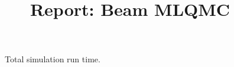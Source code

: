 \documentclass[11pt, oneside]{article}
\title{Report: Beam MLQMC}
\date{}
\newlength\figureheight
\newlength\figurewidth
\begin{document}
\maketitle

%
%
%
%
%
%
%



\begin{figure}[h]
\centering
\setlength{\figureheight}{0.3\textwidth}
\setlength{\figurewidth}{0.3\textwidth}

 \caption{\label{fig:time}Total simulation run time.}
\end{figure}


%
\end{document}
